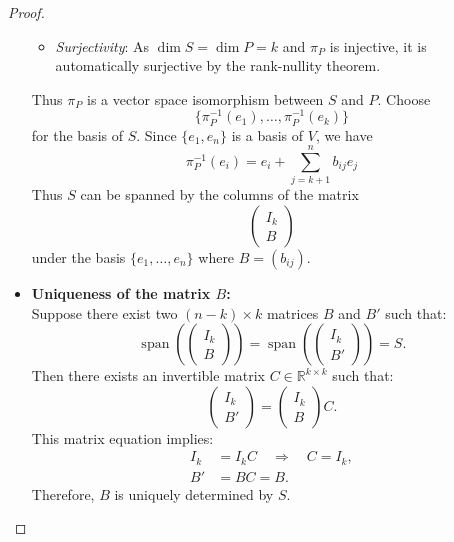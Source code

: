 \begin{problem}
\begin{proof}
\begin{itemize}
\begin{itemize}
          \item \textit{Surjectivity}: As $\dim S = \dim P = k$ and $\pi_P$ is injective, it is automatically surjective by the rank-nullity theorem.
        \end{itemize}
          Thus $\pi_P$ is a vector space isomorphism between $S$ and $P$. Choose 
          \begin{equation*}
            \{\pi_P^{-1}(e_1), \dots, \pi_P^{-1}(e_k)\}
          \end{equation*}
          for the basis of $S$. Since $\{e_1, e_n\}$ is a basis of $V$, we have
          \begin{equation*}
            \pi_P^{-1}(e_i) = e_i + \sum_{j=k+1}^{n}b_{ij}e_j
          \end{equation*}
          Thus $S$ can be spanned by the columns of the matrix
          $$\begin{pmatrix}
            I_k\\ B
          \end{pmatrix}$$
          under the basis $\{e_1, \dots, e_n\}$ where $B = (b_{ij})$.
          \item \textbf{Uniqueness of the matrix $B$:} \\
          Suppose there exist two $(n-k) \times k$ matrices $B$ and $B'$ such that:
          \begin{equation*}
            \operatorname{span}\left(
              \begin{pmatrix} I_k \\ B \end{pmatrix}
              \right) = \operatorname{span}\left(
              \begin{pmatrix} I_k \\ B' \end{pmatrix}
              \right) = S.
          \end{equation*}
          Then there exists an invertible matrix $C \in \mathbb{R}^{k \times k}$ such that:     
          \begin{equation*}
            \begin{pmatrix} I_k \\ B' \end{pmatrix}
            = 
           \begin{pmatrix} I_k \\ B \end{pmatrix}
            C.
          \end{equation*}
          This matrix equation implies:
          \begin{align*}
            I_k &= I_k C \quad \Rightarrow \quad C = I_k, \\
            B' &= B C = B.
          \end{align*}
          Therefore, $B$ is uniquely determined by $S$.
      \end{itemize}
    \end{proof}
\end{problem}

